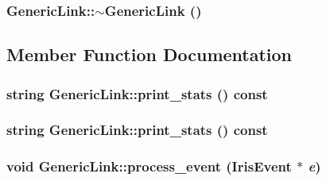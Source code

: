 \hypertarget{classGenericLink_c67cbdcd115d4e41db4c379119bfdcc4}{
\subsubsection[{$\sim$GenericLink}]{\setlength{\rightskip}{0pt plus 5cm}GenericLink::$\sim$GenericLink ()}}
\label{classGenericLink_c67cbdcd115d4e41db4c379119bfdcc4}




\subsection{Member Function Documentation}
\hypertarget{classGenericLink_10ccb365b945b9ad7ea3b49c68069d41}{
\subsubsection[{print\_\-stats}]{\setlength{\rightskip}{0pt plus 5cm}string GenericLink::print\_\-stats () const}}
\label{classGenericLink_10ccb365b945b9ad7ea3b49c68069d41}


\hypertarget{classGenericLink_10ccb365b945b9ad7ea3b49c68069d41}{
\subsubsection[{print\_\-stats}]{\setlength{\rightskip}{0pt plus 5cm}string GenericLink::print\_\-stats () const}}
\label{classGenericLink_10ccb365b945b9ad7ea3b49c68069d41}


\hypertarget{classGenericLink_c09533f8445eb3c550c744fd4ada7324}{
\subsubsection[{process\_\-event}]{\setlength{\rightskip}{0pt plus 5cm}void GenericLink::process\_\-event ({\bf IrisEvent} $\ast$ {\em e})}}
\label{classGenericLink_c09533f8445eb3c550c744fd4ada7324}




